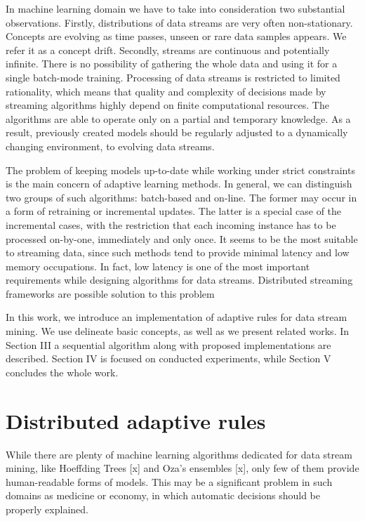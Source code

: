 \documentclass[journal]{IEEEtran}
\begin{document}
In machine learning domain we have to take into consideration two substantial observations. Firstly, distributions of data streams are very often non-stationary. Concepts are evolving as time passes, unseen or rare data samples appears. We refer it as a concept drift. Secondly, streams are continuous and potentially infinite. There is no possibility of gathering the whole data and using it for a single batch-mode training. Processing of data streams is restricted to limited rationality, which means that quality and complexity of decisions made by streaming algorithms highly depend on finite computational resources. The algorithms are able to operate only on a partial and temporary knowledge. As a result, previously created models should be regularly adjusted to a dynamically changing environment, to evolving data streams.

The problem of keeping models up-to-date while working under strict constraints is the main concern of adaptive learning methods. In general, we can distinguish two groups of such algorithms: batch-based and on-line. The former may occur in a form of retraining or incremental updates. The latter is a special case of the incremental cases, with the restriction that each incoming instance has to be processed on-by-one, immediately and only once. It seems to be the most suitable to streaming data, since such methods tend to provide minimal latency and low memory occupations. In fact, low latency is one of the most important requirements while designing algorithms for data streams. Distributed streaming frameworks are possible solution to this problem

In this work, we introduce an implementation of adaptive rules for data stream mining. We use delineate basic concepts, as well as we present related works. In Section III a sequential algorithm along with proposed implementations are described. Section IV is focused on conducted experiments, while Section V concludes the whole work.

\section{Distributed adaptive rules}

While there are plenty of machine learning algorithms dedicated for data stream mining, like Hoeffding Trees [x] and Oza's ensembles [x], only few of them provide human-readable forms of models. This may be a significant problem in such domains as medicine or economy, in which automatic decisions should be properly explained.
\end{document}
